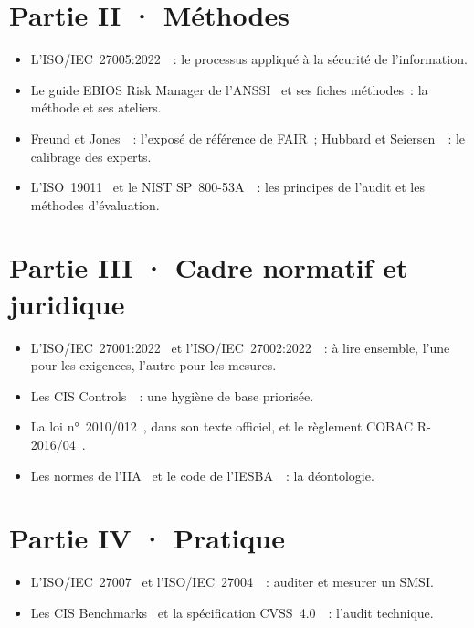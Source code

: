 \section*{Partie II · Méthodes}

\begin{itemize}
    \item L'ISO/IEC~27005:2022~\cite{iso27005_2022}~: le processus appliqué à
          la sécurité de l'information.
    \item Le guide EBIOS Risk Manager de l'ANSSI~\cite{anssi2018ebios} et ses
          fiches méthodes~: la méthode et ses ateliers.
    \item Freund et Jones~\cite{freund2015fair}~: l'exposé de référence de
          FAIR~; Hubbard et Seiersen~\cite{hubbard2016measure}~: le calibrage
          des experts.
    \item L'ISO~19011~\cite{iso19011_2018} et le NIST SP~800-53A~\cite{nist2022sp80053a}~:
          les principes de l'audit et les méthodes d'évaluation.
\end{itemize}

\section*{Partie III · Cadre normatif et juridique}

\begin{itemize}
    \item L'ISO/IEC~27001:2022~\cite{iso27001_2022} et l'ISO/IEC~27002:2022~\cite{iso27002_2022}~:
          à lire ensemble, l'une pour les exigences, l'autre pour les
          mesures.
    \item Les CIS Controls~\cite{cis2021controls}~: une hygiène de base
          priorisée.
    \item La loi n°~2010/012~\cite{loi2010012}, dans son texte officiel, et le
          règlement COBAC R-2016/04~\cite{cobac2016r04}.
    \item Les normes de l'IIA~\cite{iia2024gias} et le code de
          l'IESBA~\cite{iesba2023code}~: la déontologie.
\end{itemize}

\section*{Partie IV · Pratique}

\begin{itemize}
    \item L'ISO/IEC~27007~\cite{iso27007_2020} et l'ISO/IEC~27004~\cite{iso27004_2016}~:
          auditer et mesurer un SMSI.
    \item Les CIS Benchmarks~\cite{cis2026benchmarks} et la spécification
          CVSS~4.0~\cite{first2023cvss4}~: l'audit technique.
\end{itemize}

